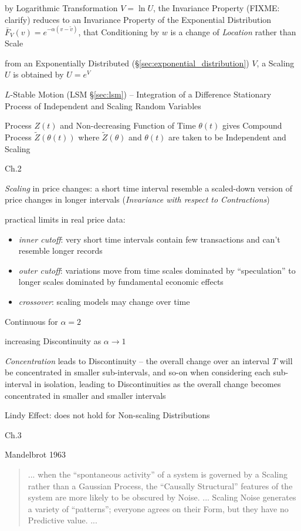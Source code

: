 by Logarithmic Transformation $V = \ln U$, the Invariance Property (FIXME:
clarify) reduces to an Invariance Property of the Exponential Distribution
$\bar{F}_V(v) = e^{-\alpha(v - \tilde{v})}$, that Conditioning by $w$ is a
change of \emph{Location} rather than Scale

from an Exponentially Distributed (\S\ref{sec:exponential_distribution}) $V$, a
Scaling $U$ is obtained by $U = e^V$

\fist $L$-Stable Motion (LSM \S\ref{sec:lsm}) -- Integration of a Difference
Stationary Process of Independent and Scaling Random Variables

Process $Z(t)$ and Non-decreasing Function of Time $\theta(t)$ gives Compound
Process $\tilde{Z}(\theta(t))$ where $\tilde{Z}(\theta)$ and $\theta(t)$ are
taken to be Independent and Scaling

Ch.2

\emph{Scaling} in price changes: a short time interval resemble a scaled-down
version of price changes in longer intervals (\emph{Invariance with respect to
  Contractions})

practical limits in real price data:
\begin{itemize}
  \item \emph{inner cutoff}: very short time intervals contain few transactions
    and can't resemble longer records
  \item \emph{outer cutoff}: variations move from time scales dominated by
    ``speculation'' to longer scales dominated by fundamental economic effects
  \item \emph{crossover}: scaling models may change over time
\end{itemize}

Continuous for $\alpha = 2$

increasing Discontinuity as $\alpha \to 1$

\emph{Concentration} leads to Discontinuity -- the overall change over an
interval $T$ will be concentrated in smaller sub-intervals, and so-on when
considering each sub-interval in isolation, leading to Discontinuities as the
overall change becomes concentrated in smaller and smaller intervals

Lindy Effect: does not hold for Non-scaling Distributions

Ch.3

Mandelbrot 1963

\begin{quote}
  ... when the ``spontaneous activity'' of a system is governed by a Scaling
  rather than a Gaussian Process, the ``Causally Structural'' features of the
  system are more likely to be obscured by Noise. ... Scaling Noise generates a
  variety of ``patterns''; everyone agrees on their Form, but they have no
  Predictive value. ...
\end{quote}

